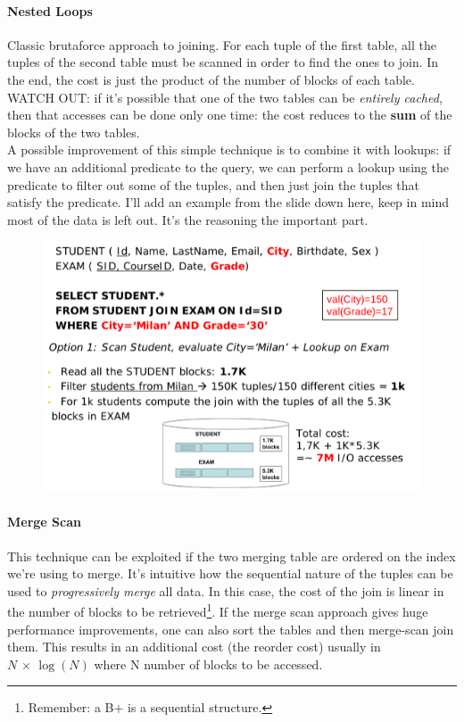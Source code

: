 \documentclass{article}
\begin{document}
				\paragraph{Nested Loops}
					Classic brutaforce approach to joining. For each tuple of the first table, all the tuples of the second table must be scanned in order to find the ones to join. In the end, the cost is just the product of the number of blocks of each table. WATCH OUT: if it's possible that one of the two tables can be \textit{entirely cached}, then that accesses can be done only one time: the cost reduces to the \textbf{sum} of the blocks of the two tables.\\
					A possible improvement of this simple technique is to combine it with lookups: if we have an additional predicate to the query, we can perform a lookup using the predicate to filter out some of the tuples, and then just join the tuples that satisfy the predicate. I'll add an example from the slide down here, keep in mind most of the data is left out. It's the reasoning the important part.
					\begin{figure}[H]
						\centering
						\includegraphics[width = \textwidth]{./images/NestedLoop.png}
					\end{figure}

				\paragraph{Merge Scan}
					This technique can be exploited if the two merging table are ordered on the index we're using to merge. It's intuitive how the sequential nature of the tuples can be used to \textit{progressively merge} all data. In this case, the cost of the join is linear in the number of blocks to be retrieved\footnote{Remember: a B+ is a sequential structure.}. If the merge scan approach gives huge performance improvements, one can also sort the tables and then merge-scan join them. This results in an additional cost (the reorder cost) usually in $N \,\times\, \log(N)$ where N number of blocks to be accessed.
\end{document}
